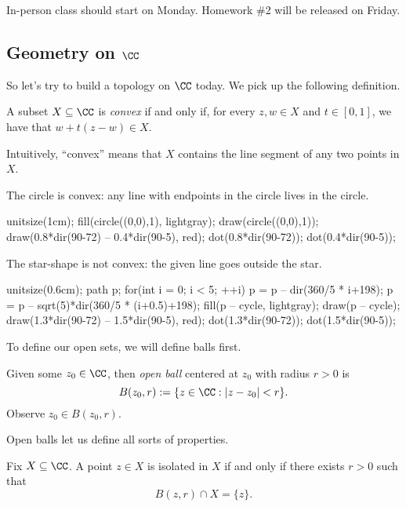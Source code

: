 
In-person class should start on Monday. Homework \#2 will be released on Friday.

\subsection{Geometry on \texorpdfstring{$\CC$}{C}}
So let's try to build a topology on $\CC$ today. We pick up the following definition.
\begin{definition}[Convex]
	A subset $X\subseteq\CC$ is \textit{convex} if and only if, for every $z,w\in X$ and $t\in[0,1]$, we have that $w+t(z-w)\in X$.
\end{definition}
Intuitively, ``convex'' means that $X$ contains the line segment of any two points in $X$.
\begin{example}
	The circle is convex: any line with endpoints in the circle lives in the circle.
	\begin{center}
		\begin{asy}
			unitsize(1cm);
			fill(circle((0,0),1), lightgray);
			draw(circle((0,0),1));
			draw(0.8*dir(90-72) -- 0.4*dir(90-5), red);
			dot(0.8*dir(90-72));
			dot(0.4*dir(90-5));
		\end{asy}
	\end{center}
\end{example}
\begin{nex}
	The star-shape is not convex: the given line goes outside the star.
	\begin{center}
		\begin{asy}
			unitsize(0.6cm);
			path p;
			for(int i = 0; i < 5; ++i)
			{
				p = p -- dir(360/5 * i+198);
				p = p -- sqrt(5)*dir(360/5 * (i+0.5)+198);
			}
			fill(p -- cycle, lightgray);
			draw(p -- cycle);
			draw(1.3*dir(90-72) -- 1.5*dir(90-5), red);
			dot(1.3*dir(90-72));
			dot(1.5*dir(90-5));
		\end{asy}
	\end{center}
\end{nex}
To define our open sets, we will define balls first.
\begin{definition}
	Given some $z_0\in\CC$, then \textit{open ball} centered at $z_0$ with radius $r>0$ is
	\[B(z_0,r):=\{z\in\CC:|z-z_0|<r\}.\]
	Observe $z_0\in B(z_0,r)$.
\end{definition}
Open balls let us define all sorts of properties.
\begin{defi}[Isolated]
	Fix $X\subseteq\CC$. A point $z\in X$ is isolated in $X$ if and only if there exists $r>0$ such that
	\[B(z,r)\cap X=\{z\}.\]
\end{defi}
